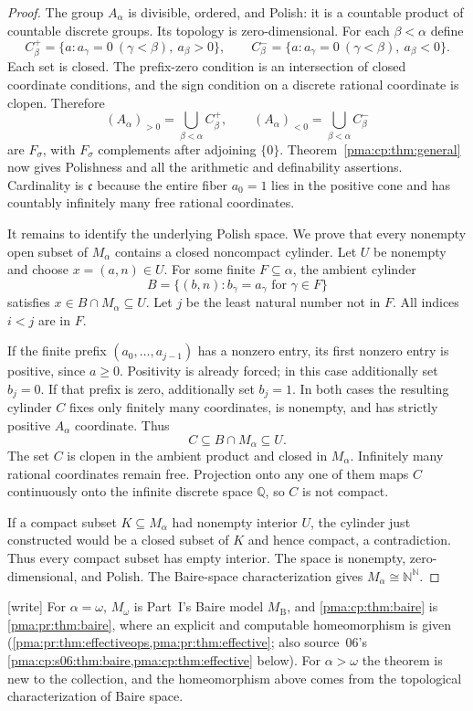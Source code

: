 \documentclass[11pt]{article}
\numberwithin{equation}{section}
\theoremstyle{definition}
\theoremstyle{remark}
\newcommand{\N}{\mathbb N}
\newcommand{\Q}{\mathbb Q}
\newcommand{\Baire}{\N^{\N}}
\newcommand{\MB}{M_{\mathrm B}}
\newcommand{\writetag}{\textup{\textsf{\small[write]}}}
\newcommand{\cp}{\mathfrak c}
\begin{document}
\begin{proof}
The group $A_\alpha$ is divisible, ordered, and Polish: it is a countable
product of countable discrete groups. Its topology is zero-dimensional.
For each $\beta<\alpha$ define
\[
C_\beta^+=\{a:a_\gamma=0\ (\gamma<\beta),\ a_\beta>0\},\qquad
C_\beta^-=\{a:a_\gamma=0\ (\gamma<\beta),\ a_\beta<0\}.
\]
Each set is closed. The prefix-zero condition is an intersection of
closed coordinate conditions, and the sign condition on a discrete
rational coordinate is clopen. Therefore
\[
(A_\alpha)_{>0}=\bigcup_{\beta<\alpha}C_\beta^+,
\qquad
(A_\alpha)_{<0}=\bigcup_{\beta<\alpha}C_\beta^-
\]
are $F_\sigma$, with $F_\sigma$ complements after adjoining $\{0\}$.
Theorem~\ref{pma:cp:thm:general} now gives Polishness and all the arithmetic
and definability assertions. Cardinality is $\cp$ because the entire
fiber $a_0=1$ lies in the positive cone and has countably infinitely many
free rational coordinates.

It remains to identify the underlying Polish space. We prove that every
nonempty open subset of $M_\alpha$ contains a closed noncompact cylinder.
Let $U$ be nonempty and choose $x=(a,n)\in U$. For some finite
$F\subseteq\alpha$, the ambient cylinder
\[
B=\{(b,n):b_\gamma=a_\gamma\text{ for }\gamma\in F\}
\]
satisfies $x\in B\cap M_\alpha\subseteq U$. Let $j$ be the least
natural number not in $F$. All indices $i<j$ are in $F$.

If the finite prefix $(a_0,\ldots,a_{j-1})$ has a nonzero entry, its first
nonzero entry is positive, since $a\geq0$. Positivity is already forced;
in this case additionally set $b_j=0$. If that prefix is zero, additionally
set $b_j=1$. In both cases the resulting cylinder $C$ fixes only finitely
many coordinates, is nonempty, and has strictly positive $A_\alpha$
coordinate. Thus
\[
C\subseteq B\cap M_\alpha\subseteq U.
\]
The set $C$ is clopen in the ambient product and closed in $M_\alpha$.
Infinitely many rational coordinates remain free. Projection onto any one
of them maps $C$ continuously onto the infinite discrete space $\Q$, so
$C$ is not compact.

If a compact subset $K\subseteq M_\alpha$ had nonempty interior $U$,
the cylinder just constructed would be a closed subset of $K$ and hence
compact, a contradiction. Thus every compact subset has empty interior.
The space is nonempty, zero-dimensional, and Polish. The Baire-space
characterization gives $M_\alpha\cong\Baire$.
\end{proof}

\noindent\writetag{} For $\alpha=\omega$, $M_\omega$ is Part~I's Baire model
$\MB$, and \cref{pma:cp:thm:baire} is \cref{pma:pr:thm:baire}, where an
explicit and computable homeomorphism is given
(\cref{pma:pr:thm:effectiveops,pma:pr:thm:effective}; also source~06's
\cref{pma:cp:s06:thm:baire,pma:cp:thm:effective} below). For $\alpha>\omega$
the theorem is new to the collection, and the homeomorphism above comes from
the topological characterization of Baire space.
\end{document}
